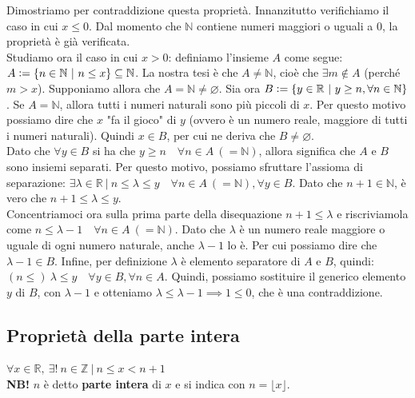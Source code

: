\documentclass{article}
\begin{document}
\noindent Dimostriamo per contraddizione questa proprietà. Innanzitutto verifichiamo il caso in cui $x \leq 0$. Dal momento che $\mathbb{N}$ contiene numeri maggiori o uguali a 0, la proprietà è già verificata. \\
Studiamo ora il caso in cui $x > 0$: definiamo l'insieme $A$ come segue: $A \vcentcolon = \{ n \in \mathbb{N} \ | \ n \leq x \} \subseteq \mathbb{N}$. La nostra tesi è che $A \neq \mathbb{N}$, cioè che $\exists m \notin A$ (perché $m > x$). Supponiamo allora che $A = \mathbb{N} \neq \varnothing$. Sia ora $B \vcentcolon = \{ y \in \mathbb{R} \ | \ y \geq n, \forall n \in \mathbb{N} \}$. Se $A = \mathbb{N}$, allora tutti i numeri naturali sono più piccoli di $x$. Per questo motivo possiamo dire che $x$ "fa il gioco" di $y$ (ovvero è un numero reale, maggiore di tutti i numeri naturali). Quindi $x \in B$, per cui ne deriva che $B \neq \varnothing$. \\
Dato che $\forall y \in B$ si ha che $y \geq n \quad \forall n \in A \ (= \mathbb{N})$, allora significa che $A$ e $B$ sono insiemi separati. Per questo motivo, possiamo sfruttare l'assioma di separazione: $\exists \lambda \in \mathbb{R} \ | \ n \leq \lambda \leq y \quad \forall n \in A \ (= \mathbb{N}), \forall y \in B$. Dato che $n+1 \in \mathbb{N}$, è vero che $n+1 \leq \lambda \leq y$. \\
Concentriamoci ora sulla prima parte della disequazione $n+1 \leq \lambda$ e riscriviamola come $n \leq \lambda - 1 \quad \forall n \in A \ (= \mathbb{N})$. Dato che $\lambda$ è un numero reale maggiore o uguale di ogni numero naturale, anche $\lambda - 1$ lo è. Per cui possiamo dire che $\lambda - 1 \in B$. Infine, per definizione $\lambda$ è elemento separatore di $A$ e $B$, quindi: $(n \leq) \ \lambda \leq y \quad \forall y \in B, \forall n \in A$. Quindi, possiamo sostituire il generico elemento $y$ di $B$, con $\lambda - 1$ e otteniamo $\lambda \leq \lambda - 1 \implies 1 \leq 0$, che è una contraddizione.

\subsection{Proprietà della parte intera}
$\forall x \in \mathbb{R}, \ \exists ! \ n \in \mathbb{Z} \ | \ n \leq x < n + 1$ \\

\noindent\textbf{NB!} $n$ è detto \textbf{parte intera} di $x$ e si indica con $n = \lfloor x \rfloor$.
\end{document}
